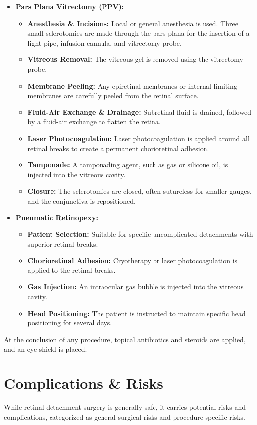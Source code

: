 \begin{itemize}
  \item \textbf{Pars Plana Vitrectomy (PPV):}
    \begin{itemize}
      \item \textbf{Anesthesia \& Incisions:} Local or general anesthesia is used. Three small sclerotomies are made through the pars plana for the insertion of a light pipe, infusion cannula, and vitrectomy probe.
      \item \textbf{Vitreous Removal:} The vitreous gel is removed using the vitrectomy probe.
      \item \textbf{Membrane Peeling:} Any epiretinal membranes or internal limiting membranes are carefully peeled from the retinal surface.
      \item \textbf{Fluid-Air Exchange \& Drainage:} Subretinal fluid is drained, followed by a fluid-air exchange to flatten the retina.
      \item \textbf{Laser Photocoagulation:} Laser photocoagulation is applied around all retinal breaks to create a permanent chorioretinal adhesion.
      \item \textbf{Tamponade:} A tamponading agent, such as gas or silicone oil, is injected into the vitreous cavity.
      \item \textbf{Closure:} The sclerotomies are closed, often sutureless for smaller gauges, and the conjunctiva is repositioned.
    \end{itemize}
  
  \item \textbf{Pneumatic Retinopexy:}
    \begin{itemize}
      \item \textbf{Patient Selection:} Suitable for specific uncomplicated detachments with superior retinal breaks.
      \item \textbf{Chorioretinal Adhesion:} Cryotherapy or laser photocoagulation is applied to the retinal breaks.
      \item \textbf{Gas Injection:} An intraocular gas bubble is injected into the vitreous cavity.
      \item \textbf{Head Positioning:} The patient is instructed to maintain specific head positioning for several days.
    \end{itemize}
\end{itemize}

At the conclusion of any procedure, topical antibiotics and steroids are applied, and an eye shield is placed.

\section*{Complications \& Risks}
While retinal detachment surgery is generally safe, it carries potential risks and complications, categorized as general surgical risks and procedure-specific risks.

